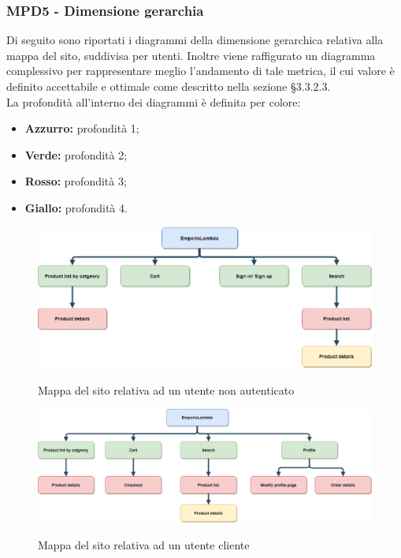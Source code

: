 \subsubsection{MPD5 - Dimensione gerarchia}
Di seguito sono riportati i diagrammi della dimensione gerarchica relativa alla mappa del sito, suddivisa per utenti. Inoltre viene raffigurato un diagramma complessivo per rappresentare meglio l'andamento di tale metrica, il cui valore è definito accettabile e ottimale come descritto nella sezione §3.3.2.3.\\
La profondità all'interno dei diagrammi è definita per colore:
\begin{itemize}
	\item \textbf{Azzurro:} profondità 1;
	\item \textbf{Verde:} profondità 2;
	\item \textbf{Rosso:} profondità 3;
	\item \textbf{Giallo:} profondità 4.
\end{itemize}

\begin{figure}[H]
\centering
\includegraphics[scale=0.40]{res/ResocontoAttivitaDiVerifica/res/metriche/grafici/img/mappaSitoEsterno.png}\\
\caption{Mappa del sito relativa ad un utente non autenticato}
\end{figure}

\begin{figure}[H]
\centering
\includegraphics[scale=0.35]{res/ResocontoAttivitaDiVerifica/res/metriche/grafici/img/mappaSitoCliente.png}\\
\caption{Mappa del sito relativa ad un utente cliente}
\end{figure}

